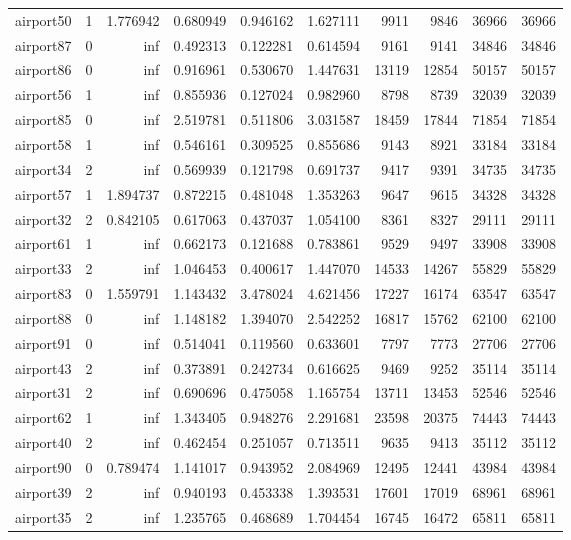 \begin{longtable}{|l|r|r|r|r|r|r|r|r|r|}
airport50 & 1 & 1.776942 & 0.680949 & 0.946162 & 1.627111 & 9911 & 9846 & 36966 & 36966 \\
airport87 & 0 & inf & 0.492313 & 0.122281 & 0.614594 & 9161 & 9141 & 34846 & 34846 \\
airport86 & 0 & inf & 0.916961 & 0.530670 & 1.447631 & 13119 & 12854 & 50157 & 50157 \\
airport56 & 1 & inf & 0.855936 & 0.127024 & 0.982960 & 8798 & 8739 & 32039 & 32039 \\
airport85 & 0 & inf & 2.519781 & 0.511806 & 3.031587 & 18459 & 17844 & 71854 & 71854 \\
airport58 & 1 & inf & 0.546161 & 0.309525 & 0.855686 & 9143 & 8921 & 33184 & 33184 \\
airport34 & 2 & inf & 0.569939 & 0.121798 & 0.691737 & 9417 & 9391 & 34735 & 34735 \\
airport57 & 1 & 1.894737 & 0.872215 & 0.481048 & 1.353263 & 9647 & 9615 & 34328 & 34328 \\
airport32 & 2 & 0.842105 & 0.617063 & 0.437037 & 1.054100 & 8361 & 8327 & 29111 & 29111 \\
airport61 & 1 & inf & 0.662173 & 0.121688 & 0.783861 & 9529 & 9497 & 33908 & 33908 \\
airport33 & 2 & inf & 1.046453 & 0.400617 & 1.447070 & 14533 & 14267 & 55829 & 55829 \\
airport83 & 0 & 1.559791 & 1.143432 & 3.478024 & 4.621456 & 17227 & 16174 & 63547 & 63547 \\
airport88 & 0 & inf & 1.148182 & 1.394070 & 2.542252 & 16817 & 15762 & 62100 & 62100 \\
airport91 & 0 & inf & 0.514041 & 0.119560 & 0.633601 & 7797 & 7773 & 27706 & 27706 \\
airport43 & 2 & inf & 0.373891 & 0.242734 & 0.616625 & 9469 & 9252 & 35114 & 35114 \\
airport31 & 2 & inf & 0.690696 & 0.475058 & 1.165754 & 13711 & 13453 & 52546 & 52546 \\
airport62 & 1 & inf & 1.343405 & 0.948276 & 2.291681 & 23598 & 20375 & 74443 & 74443 \\
airport40 & 2 & inf & 0.462454 & 0.251057 & 0.713511 & 9635 & 9413 & 35112 & 35112 \\
airport90 & 0 & 0.789474 & 1.141017 & 0.943952 & 2.084969 & 12495 & 12441 & 43984 & 43984 \\
airport39 & 2 & inf & 0.940193 & 0.453338 & 1.393531 & 17601 & 17019 & 68961 & 68961 \\
airport35 & 2 & inf & 1.235765 & 0.468689 & 1.704454 & 16745 & 16472 & 65811 & 65811 \\

\end{longtable}
